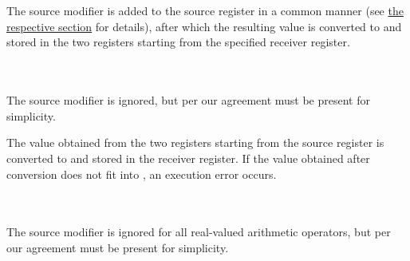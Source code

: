 \vspace{-0.35cm}

\paragraph{}\

The source modifier is added to the source register in a common manner (see \hyperlink{types:twos_complement}{the respective section} for details), after which the resulting  value is converted to  and stored in the two registers starting from the specified receiver register.

\vspace{-0.35cm}

\paragraph{}\

The source modifier is ignored, but per our agreement must be present for simplicity.

The  value obtained from the two registers starting from the source register is converted to  and stored in the receiver register. If the value obtained after conversion does not fit into , an execution error occurs.

\vspace{-0.35cm}

\paragraph{}\

The source modifier is ignored for all real-valued arithmetic operators, but per our agreement must be present for simplicity.
